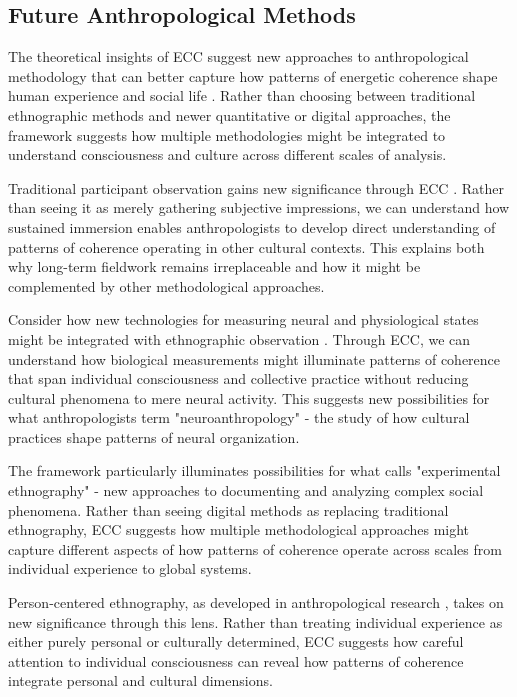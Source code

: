 \subsection{Future Anthropological Methods}

The theoretical insights of ECC suggest new approaches to anthropological methodology that can better capture how patterns of energetic coherence shape human experience and social life \cite{rabinow2011accompaniment}. Rather than choosing between traditional ethnographic methods and newer quantitative or digital approaches, the framework suggests how multiple methodologies might be integrated to understand consciousness and culture across different scales of analysis.

Traditional participant observation gains new significance through ECC \cite{fortun2012ethnography}. Rather than seeing it as merely gathering subjective impressions, we can understand how sustained immersion enables anthropologists to develop direct understanding of patterns of coherence operating in other cultural contexts. This explains both why long-term fieldwork remains irreplaceable and how it might be complemented by other methodological approaches.

Consider how new technologies for measuring neural and physiological states might be integrated with ethnographic observation \cite{roepstorff2013slow}. Through ECC, we can understand how biological measurements might illuminate patterns of coherence that span individual consciousness and collective practice without reducing cultural phenomena to mere neural activity. This suggests new possibilities for what anthropologists term "neuroanthropology" - the study of how cultural practices shape patterns of neural organization.

The framework particularly illuminates possibilities for what \cite{fortun2012ethnography} calls "experimental ethnography" - new approaches to documenting and analyzing complex social phenomena. Rather than seeing digital methods as replacing traditional ethnography, ECC suggests how multiple methodological approaches might capture different aspects of how patterns of coherence operate across scales from individual experience to global systems.

Person-centered ethnography, as developed in anthropological research \cite{hollan2000constructivist}, takes on new significance through this lens. Rather than treating individual experience as either purely personal or culturally determined, ECC suggests how careful attention to individual consciousness can reveal how patterns of coherence integrate personal and cultural dimensions.

